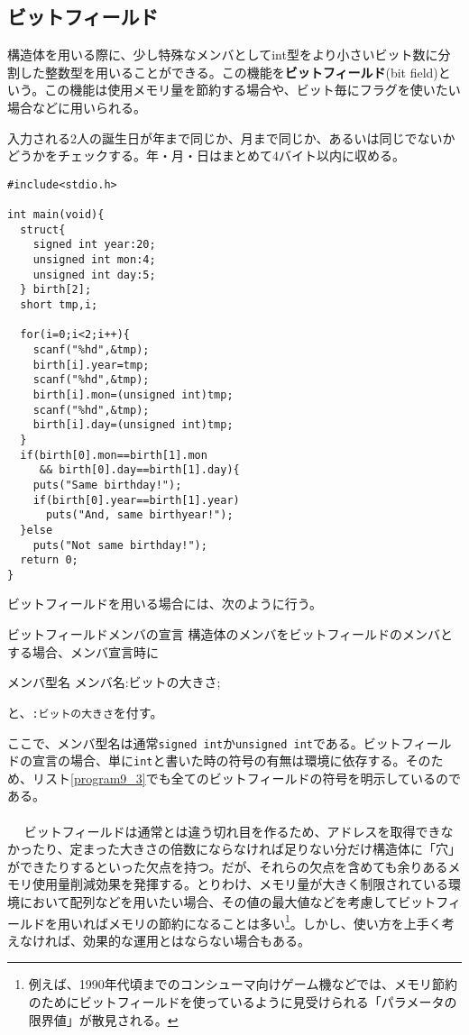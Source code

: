 \subsection{ビットフィールド}
構造体を用いる際に、少し特殊なメンバとしてint型をより小さいビット数に分割した整数型を用いることができる。この機能を\textbf{ビットフィールド}(bit field)という。この機能は使用メモリ量を節約する場合や、ビット毎にフラグを使いたい場合などに用いられる。
\begin{boxnote}
入力される2人の誕生日が年まで同じか、月まで同じか、あるいは同じでないかどうかをチェックする。年・月・日はまとめて4バイト以内に収める。
\end{boxnote}
\begin{boxnote}
\begin{multicols}{2}
\begin{lstlisting}[caption=誕生日のチェック,label=program9_3]
#include<stdio.h>

int main(void){
  struct{
    signed int year:20;
    unsigned int mon:4;
    unsigned int day:5;
  } birth[2];
  short tmp,i;

  for(i=0;i<2;i++){
    scanf("%hd",&tmp);
    birth[i].year=tmp;
    scanf("%hd",&tmp);
    birth[i].mon=(unsigned int)tmp;
    scanf("%hd",&tmp);
    birth[i].day=(unsigned int)tmp;
  }
  if(birth[0].mon==birth[1].mon
     && birth[0].day==birth[1].day){
    puts("Same birthday!");
    if(birth[0].year==birth[1].year)
      puts("And, same birthyear!");
  }else
    puts("Not same birthday!");
  return 0;    
}
\end{lstlisting}
\end{multicols}
\end{boxnote}

ビットフィールドを用いる場合には、次のように行う。
\begin{itembox}[l]{ビットフィールドメンバの宣言}
構造体のメンバをビットフィールドのメンバとする場合、メンバ宣言時に
\begin{code}
メンバ型名 メンバ名:ビットの大きさ;
\end{code}
と、\verb|:ビットの大きさ|を付す。
\end{itembox}

ここで、メンバ型名は通常\verb|signed int|か\verb|unsigned int|である。ビットフィールドの宣言の場合、単に\verb|int|と書いた時の符号の有無は環境に依存する。そのため、リスト\ref{program9_3}でも全てのビットフィールドの符号を明示しているのである。
\\ \\　
ビットフィールドは通常とは違う切れ目を作るため、アドレスを取得できなかったり、定まった大きさの倍数にならなければ足りない分だけ構造体に「穴」ができたりするといった欠点を持つ。だが、それらの欠点を含めても余りあるメモリ使用量削減効果を発揮する。とりわけ、メモリ量が大きく制限されている環境において配列などを用いたい場合、その値の最大値などを考慮してビットフィールドを用いればメモリの節約になることは多い\footnote{例えば、1990年代頃までのコンシューマ向けゲーム機などでは、メモリ節約のためにビットフィールドを使っているように見受けられる「パラメータの限界値」が散見される。}。しかし、使い方を上手く考えなければ、効果的な運用とはならない場合もある。


